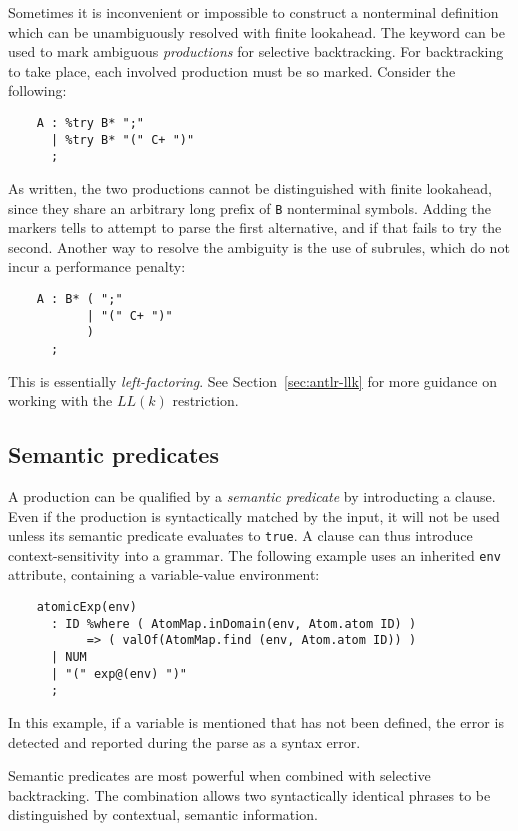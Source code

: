 Sometimes it is inconvenient or impossible to construct a nonterminal definition which can be unambiguously resolved with finite lookahead.%
  The  keyword can be used to mark ambiguous \emph{productions} for selective backtracking.  For backtracking to take place, each involved production must be so marked.  Consider the following:
\begin{verbatim}
    A : %try B* ";"
      | %try B* "(" C+ ")"
      ;
\end{verbatim}
As written, the two productions cannot be distinguished with finite lookahead, since they share an arbitrary long prefix of {\tt B} nonterminal symbols.  Adding the  markers tells \antlr{} to attempt to parse the first alternative, and if that fails to try the second.  Another way to resolve the ambiguity is the use of subrules, which do not incur a performance penalty:
\begin{verbatim}
    A : B* ( ";"
           | "(" C+ ")"
           )
      ;
\end{verbatim}
This is essentially \emph{left-factoring}. See Section~\ref{sec:antlr-llk} for more guidance on working with the $LL(k)$ restriction.

\subsection{Semantic predicates}

A production can be qualified by a \emph{semantic predicate} by introducting a  clause.  Even if the production is syntactically matched by the input, it will not be used unless its semantic predicate evaluates to {\tt true}.  A  clause can thus introduce context-sensitivity into a grammar.  The following example uses an inherited {\tt env} attribute, containing a variable-value environment:
\begin{verbatim}
    atomicExp(env)
      : ID %where ( AtomMap.inDomain(env, Atom.atom ID) )
           => ( valOf(AtomMap.find (env, Atom.atom ID)) )
      | NUM
      | "(" exp@(env) ")"
      ;
\end{verbatim}
In this example, if a variable is mentioned that has not been defined, the error is detected and reported during the parse as a syntax error.

Semantic predicates are most powerful when combined with selective backtracking.  The combination allows two syntactically identical phrases to be distinguished by contextual, semantic information.

